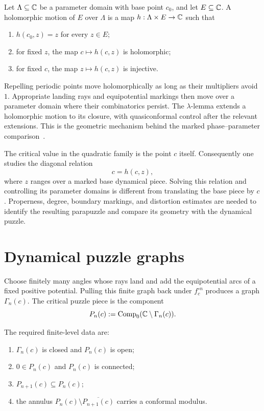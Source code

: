 \begin{definition}
Let $\Lambda\subseteq\mathbb C$ be a parameter domain with base point
$c_0$, and let $E\subseteq\mathbb C$.  A holomorphic motion of $E$ over
$\Lambda$ is a map $h:\Lambda\times E\to\mathbb C$ such that
\begin{enumerate}
\item $h(c_0,z)=z$ for every $z\in E$;
\item for fixed $z$, the map $c\mapsto h(c,z)$ is holomorphic;
\item for fixed $c$, the map $z\mapsto h(c,z)$ is injective.
\end{enumerate}
\end{definition}

Repelling periodic points move holomorphically as long as their
multipliers avoid $1$.  Appropriate landing rays and equipotential
markings then move over a parameter domain where their combinatorics
persist.  The $\lambda$-lemma extends a holomorphic motion to its
closure, with quasiconformal control after the relevant extensions.
This is the geometric mechanism behind the marked phase--parameter
comparison~\cite{LyubichBook,LyubichIII}.

The critical value in the quadratic family is the point $c$ itself.
Consequently one studies the diagonal relation
\[
 c=h(c,z),
\]
where $z$ ranges over a marked base dynamical piece.  Solving this
relation and controlling its parameter domains is different from
translating the base piece by $c$.  Properness, degree, boundary
markings, and distortion estimates are needed to identify the resulting
parapuzzle and compare its geometry with the dynamical puzzle.

\section{Dynamical puzzle graphs}

\begin{definition}
\label{def:finite-dynamical-graph}
Choose finitely many angles whose rays land and add the equipotential arcs
of a fixed positive potential.  Pulling this finite graph back under
$f_c^{\circ n}$ produces a graph $\Gamma_n(c)$.  The critical puzzle piece
is the component
\[
 P_n(c):=\operatorname{Comp}_0(\mathbb C\setminus\Gamma_n(c)).
\]
\end{definition}

\begin{proposition}
\label{prop:puzzle-properties}
The required finite-level data are:
\begin{enumerate}
\item $\Gamma_n(c)$ is closed and $P_n(c)$ is open;
\item $0\in P_n(c)$ and $P_n(c)$ is connected;
\item $P_{n+1}(c)\subseteq P_n(c)$;
\item the annulus $P_n(c)\setminus\overline{P_{n+1}(c)}$ carries a
      conformal modulus.
\end{enumerate}
\end{proposition}

